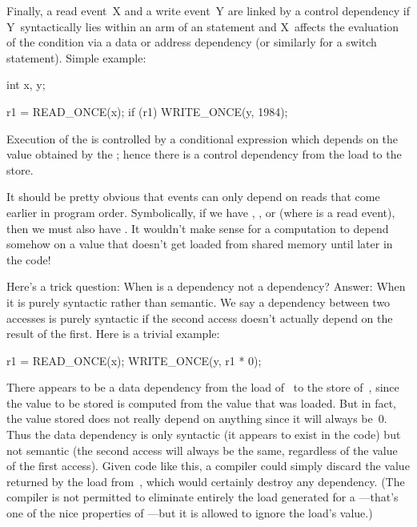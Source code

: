 Finally, a read event~X and a write event~Y are linked by a control
dependency if Y~syntactically lies within an arm of an  statement
and X~affects the evaluation of the  condition via a data or address
dependency (or similarly for a switch statement).
Simple example:

\begin{VerbatimU}
	int x, y;

	r1 = READ_ONCE(x);
	if (r1)
		WRITE_ONCE(y, 1984);
\end{VerbatimU}

Execution of the  is controlled by a conditional expression
which depends on the value obtained by the ; hence there is
a control dependency from the load to the store.

It should be pretty obvious that events can only depend on reads that
come earlier in program order.
Symbolically, if we have , , or
 (where  is a read event), then we must also
have .
It wouldn't make sense for a computation to depend somehow on a value
that doesn't get loaded from shared memory until later in the code!

Here's a trick question:
When is a dependency not a dependency?
Answer:
When it is purely syntactic rather than semantic.
We say a dependency between two accesses is purely syntactic if the
second access doesn't actually depend on the result of the first.
Here is a trivial example:

\begin{VerbatimU}
	r1 = READ_ONCE(x);
	WRITE_ONCE(y, r1 * 0);
\end{VerbatimU}

There appears to be a data dependency from the load of~ to the store
of~, since the value to be stored is computed from the value that was
loaded.
But in fact, the value stored does not really depend on anything since
it will always be~0.
Thus the data dependency is only syntactic (it appears to exist in the
code) but not semantic (the second access will always be the same,
regardless of the value of the first access).
Given code like this, a compiler could simply discard the value
returned by the load from~, which would certainly destroy
any dependency.
(The compiler is not permitted to eliminate entirely the load generated
for a ---that's one of the nice properties of
---but it is allowed to ignore the load's value.)

